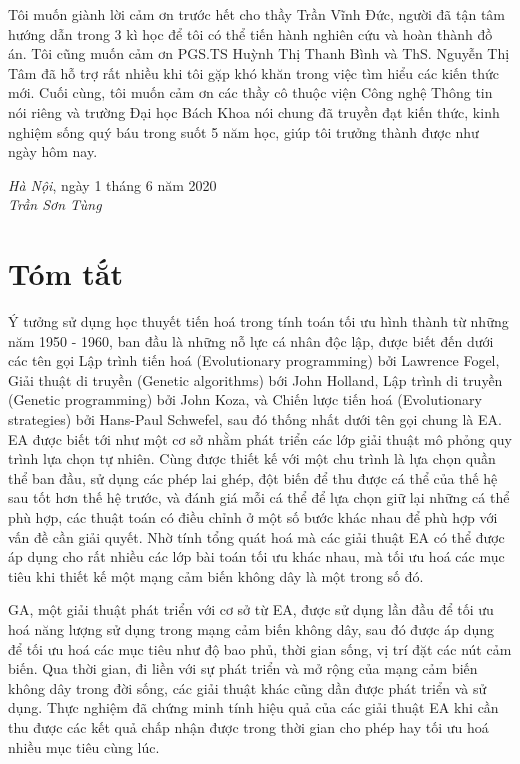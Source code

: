 \documentclass{hust}
\begin{document}
Tôi muốn giành lời cảm ơn trước hết cho thầy Trần Vĩnh Đức, người đã tận tâm hướng dẫn trong 3 kì học để tôi có thể tiến hành nghiên cứu và hoàn thành đồ án. Tôi cũng muốn cảm ơn PGS.TS Huỳnh Thị Thanh Bình và ThS. Nguyễn Thị Tâm đã hỗ trợ rất nhiều khi tôi gặp khó khăn trong việc tìm hiểu các kiến thức mới. Cuối cùng, tôi muốn cảm ơn các thầy cô thuộc viện Công nghệ Thông tin nói riêng và trường Đại học Bách Khoa nói chung đã truyền đạt kiến thức, kinh nghiệm sống quý báu trong suốt 5 năm học, giúp tôi trưởng thành được như ngày hôm nay.

\begin{flushright}
	\begin{minipage}[t]{0.5\textwidth}
		\begin{center}
			\textit{Hà Nội}, ngày 1 tháng 6 năm 2020\\
			
			\textit{Trần Sơn Tùng}
		\end{center}
	\end{minipage}
\end{flushright}

\pagebreak

\chapter*{Tóm tắt}
Ý tưởng sử dụng học thuyết tiến hoá trong tính toán tối ưu hình thành từ những năm 1950 - 1960, ban đầu là những nỗ lực cá nhân độc lập, được biết đến dưới các tên gọi Lập trình tiến hoá (Evolutionary programming) bởi Lawrence Fogel, Giải thuật di truyền (Genetic algorithms) bới John Holland, Lập trình di truyền (Genetic programming) bởi John Koza, và Chiến lược tiến hoá (Evolutionary strategies) bởi Hans-Paul Schwefel, sau đó thống nhất dưới tên gọi chung là \Gls{EA}. \Gls{EA} được biết tới như một cơ sở nhằm phát triển các lớp giải thuật mô phỏng quy trình lựa chọn tự nhiên. Cùng được thiết kế với một chu trình là lựa chọn quần thể ban đầu, sử dụng các phép lai ghép, đột biến để thu được cá thể của thế hệ sau tốt hơn thế hệ trước, và đánh giá mỗi cá thể để lựa chọn giữ lại những cá thể phù hợp, các thuật toán có điều chỉnh ở một số bước khác nhau để phù hợp với vấn đề cần giải quyết. Nhờ tính tổng quát hoá mà các giải thuật \gls{EA} có thể được áp dụng cho rất nhiều các lớp bài toán tối ưu khác nhau, mà tối ưu hoá các mục tiêu khi thiết kế một mạng cảm biến không dây là một trong số đó.


\Gls{GA}, một giải thuật phát triển với cơ sở từ \gls{EA}, được sử dụng lần đầu để tối ưu hoá năng lượng sử dụng trong mạng cảm biến không dây, sau đó được áp dụng để tối ưu hoá các mục tiêu như độ bao phủ, thời gian sống, vị trí đặt các nút cảm biến. Qua thời gian, đi liền với sự phát triển và mở rộng của mạng cảm biến không dây trong đời sống, các giải thuật khác cũng dần được phát triển và sử dụng. Thực nghiệm đã chứng minh tính hiệu quả của các giải thuật \gls{EA} khi cần thu được các kết quả chấp nhận được trong thời gian cho phép hay tối ưu hoá nhiều mục tiêu cùng lúc.
\end{document}
